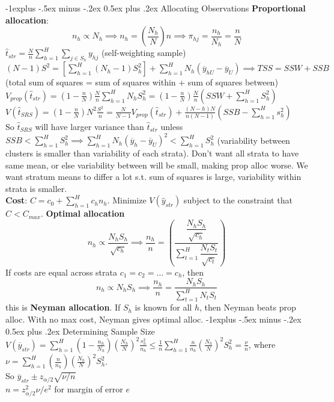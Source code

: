 \documentclass[10pt,landscape]{article}
\makeatletter
\renewcommand{\subsection}{\@startsection{subsection}{2}{0mm}%
                                {-1explus -.5ex minus -.2ex}%
                                {0.5ex plus .2ex}%
                                {\normalfont\normalsize\bfseries}}
\makeatother
\begin{document}
\begin{multicols*}{3}
\subsection{Allocating Observations}
\textbf{Proportional allocation}: $$n_h \propto N_h \implies n_h =
\left(\frac{N_h}{N}\right)n \implies \pi_{hj} = \frac{n_h}{N_h} =
\frac{n}{N}$$
$\hat{t}_{str} = \frac{N}{n} \sum_{h=1}^{H} \sum_{j \in S_h}
y_{hj}$ (self-weighting sample)
\\ $(N-1) S^2 = \left[\sum_{h=1}^{H} (N_h - 1)S_h^2\right] +
\sum_{h=1}^{H} N_h (\overline{y}_{hU} - \overline{y}_U) \implies TSS =
SSW + SSB$ (total sum of squares = sum of squares within + sum of
squares between)
\\ $V_{prop}(\hat{t}_{str}) = \left(1 - \frac{n}{N}\right) \frac{N}{n}
\sum_{h=1}^{H} N_h S_h^2 = \left(1 - \frac{n}{N}\right) \frac{N}{n}
(SSW + \sum_{h=1}^{H} S_h^2)$
\\ $V(\hat{t}_{SRS}) = \left(1 - \frac{n}{N}\right)N^2 \frac{S^2}{n} =
\frac{N}{N-1}V_{prop}(\hat{t}_{str}) + \frac{(N-h)N}{n(N-1)} (SSB -
\sum_{h=1}^{H} s_h^2)$
\\ So $\hat{t}_{SRS}$ will have larger variance than $\hat{t}_{str}$
unless $SSB < \sum_{h=1}^{H} S_h^2 \implies \sum_{h=1}^{H} N_h
(\overline{y}_h - \overline{y}_U)^2 < \sum_{h=1}^{H} S_h^2$
(variability between clusters is smaller than variability of each
strata). Don't want all strata to have same mean, or else variability
between will be small, making prop alloc worse. We want stratum means
to differ a lot s.t. sum of squares is large, variability within
strata is smaller.
\\ \textbf{Cost}: $C = c_0 + \sum_{h=1}^{H} c_h n_h$. Minimize
$V(\hat{y}_{str})$ subject to the constraint that $C <
C_{max}$. \textbf{Optimal allocation} $$n_h \propto
\frac{N_hS_h}{\sqrt{c_h}} \implies \frac{n_h}{n} =
\left(\dfrac{\dfrac{N_hS_h}{\sqrt{c_h}}}{\sum_{t = 1}^H \dfrac{N_t
      S_t}{\sqrt{c_t}}}\right)$$
If costs are equal across strata $c_1 = c_2 = \ldots = c_h$, then
$$n_h \propto N_h S_h \implies \frac{n_h}{n} =
\frac{N_hS_h}{\sum_{t=1}^H N_tS_t}$$ this is \textbf{Neyman allocation}. If
$S_h$ is known for all $h$, then Neyman beats prop alloc. With no max
cost, Neyman gives optimal alloc.
\subsection{Determining Sample Size}
$V(\overline{y}_{str}) = \sum_{h=1}^{H} \left(1 -
  \frac{n_h}{N_h}\right) \left(\frac{N_h}{N}\right)^2
\frac{s_h^2}{n_h} \leq \frac{1}{n} \sum_{h=1}^{H} \frac{n}{n_h}
\left(\frac{N_h}{N}\right)^2S_h^2 = \frac{\nu}{n}$, where $\nu =
\sum_{h=1}^{H}\left(\frac{n}{n_h}\right) \left(\frac{N_h}{N}\right)^2
S_h^2$.
\\ So $\overline{y}_{str} \pm z_{\alpha/2} \sqrt{\nu/n}$
\\ $n = z^2_{\alpha/2}\nu/e^2$ for margin of error $e$

\end{multicols*}
\end{document}
